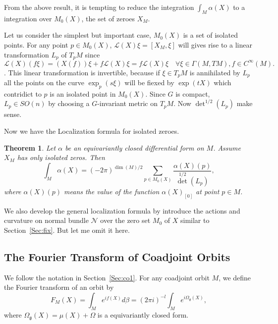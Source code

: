 \documentclass[12pt]{amsart}
\newtheorem{Thm}{Theorem}
\def\cL{{\mathcal{L}}}
\def\cN{{\mathcal{N}}}
\def\fgg{{\mathfrak{g}}}
\begin{document}
From the above result, it is tempting to reduce the integration
$\int_M\alpha(X)$ to a integration over $M_0(X)$, the set of zeroes $X_M$.

Let us consider the simplest but important case, $M_0(X)$ is a set of
isolated points.
For any point $p\in M_0(X)$,
$\cL(X)\xi = [X_M,\xi]$ will gives rise to a linear
transformation $L_p$ of $T_pM$ since 
\[\cL(X)(f\xi) = (X(f))\xi + f\cL(X)\xi = f\cL(X)\xi \quad \forall \xi
\in \Gamma(M,TM), f\in C^\infty(M).
\]. This linear transformation is invertible, because if $\xi\in T_pM$ is
annihilated by $L_p$ all the  points on the curve $\exp_p(s\xi)$ will
be fiexed by $\exp(tX)$ which contridict to  $p$ is an isolated point
in $M_0(X)$.
Since $G$ is compact, $L_p\in SO(n)$ by choosing a $G$-invariant
metric on $T_pM$. Now $\det^{1/2} (L_p)$ make sense.

Now we have the Localization formula for isolated zeroes.
  
\begin{Thm}
Let $\alpha$ be an equivariantly closed differential form
  on $M$. Assume $X_M$ has only isolated zeros. Then
\begin{equation}
\label{eq:localization}
\int_M \alpha(X) = (-2\pi)^{\dim(M)/2}\sum_{p\in M_0(X)}\frac{\alpha(X)(p)}{\det^{1/2}(L_p)},
\end{equation}
where $\alpha(X)(p)$ means the value of the function $\alpha(X)_{[0]}$
at point $p\in M$.
\end{Thm}

We also develop the general localization formula by introduce the 
actions and curvature on normal bundle $\cN$ over the zero set $M_0$ 
of $X$ similar to Section~\ref{Sec:fix}. But let me omit it here.

\subsection{The Fourier Transform of Coadjoint Orbits}
We follow the notation in Section~\ref{Sec:co1}.
For any coadjoint orbit $M$, we define the Fourier transform of an orbit
by 
\[
F_M(X) = \int_M e^{i f(X)}d\beta = (2\pi i )^{-l}\int_Me^{i\Omega_\fgg(X)}, 
\]
where $\Omega_\fgg(X) = \mu(X) + \Omega$ is a equivariantly closed form.
\end{document}
